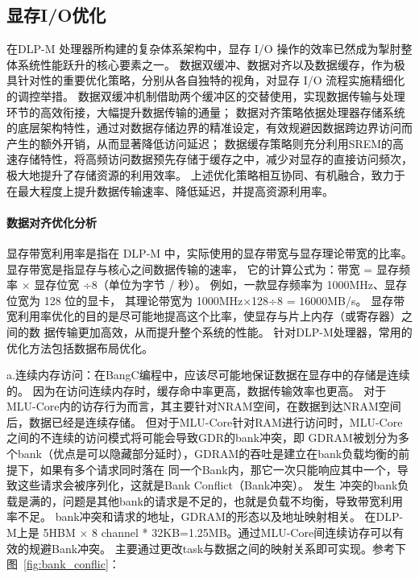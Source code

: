 


\subsection{显存I/O优化}
在DLP-M 处理器所构建的复杂体系架构中，显存 I/O 操作的效率已然成为掣肘整体系统性能跃升的核心要素之一。
数据双缓冲、数据对齐以及数据缓存，作为极具针对性的重要优化策略，分别从各自独特的视角，对显存 I/O 流程实施精细化的调控举措。
数据双缓冲机制借助两个缓冲区的交替使用，实现数据传输与处理环节的高效衔接，大幅提升数据传输的通量；
数据对齐策略依据处理器存储系统的底层架构特性，通过对数据存储边界的精准设定，有效规避因数据跨边界访问而产生的额外开销，从而显著降低访问延迟；
数据缓存策略则充分利用SREM的高速存储特性，将高频访问数据预先存储于缓存之中，减少对显存的直接访问频次，极大地提升了存储资源的利用效率。
上述优化策略相互协同、有机融合，致力于在最大程度上提升数据传输速率、降低延迟，并提高资源利用率。

\paragraph{数据对齐优化分析}

显存带宽利用率是指在 DLP-M 中，实际使用的显存带宽与显存理论带宽的比率。
显存带宽是指显存与核心之间数据传输的速率，
它的计算公式为：带宽 = 显存频率 × 显存位宽 ÷8（单位为字节 / 秒）。
例如，一款显存频率为 1000MHz、显存位宽为 128 位的显卡，
其理论带宽为 1000MHz×128÷8 = 16000MB/s。
显存带宽利用率优化的目的是尽可能地提高这个比率，使显存与片上内存（或寄存器）之间的数
据传输更加高效，从而提升整个系统的性能。
针对DLP-M处理器，常用的优化方法包括数据布局优化。

a.连续内存访问：在BangC编程中，应该尽可能地保证数据在显存中的存储是连续的。
因为在访问连续内存时，缓存命中率更高，数据传输效率也更高。
对于MLU-Core内的访存行为而言，其主要针对NRAM空间，在数据到达NRAM空间后，数据已经是连续存储。
但对于MLU-Core针对RAM进行访问时，MLU-Core之间的不连续的访问模式将可能会导致GDR的bank冲突，即
GDRAM被划分为多个bank（优点是可以隐藏部分延时），GDRAM的吞吐是建立在bank负载均衡的前提下，如果有多个请求同时落在
同一个Bank内，那它一次只能响应其中一个，导致这些请求会被序列化，这就是Bank Conflict（Bank冲突）。
发生 冲突的bank负载是满的，问题是其他bank的请求是不足的，也就是负载不均衡，导致带宽利用率不足。
bank冲突和请求的地址，GDRAM的形态以及地址映射相关。
在DLP-M上是 5HBM × 8 channel * 32KB=1.25MB。通过MLU-Core间连续访存可以有效的规避Bank冲突。
主要通过更改task与数据之间的映射关系即可实现。参考下图~\ref{fig:bank_conflic}：


